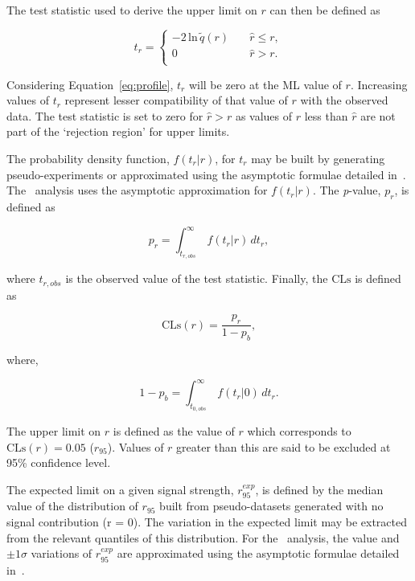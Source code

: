 The test statistic used to derive the upper limit on $r$ can then be defined as

\begin{equation}
t_r = 
\begin{cases}
-2\,\text{ln}\,\tilde{q}(r)\quad &\hat{r} \le r, \\ 
0 \quad &\hat{r} > r. \\ 
\end{cases}
\end{equation}

Considering Equation~\ref{eq:profile}, $t_r$ will be zero at the ML value of $r$.
Increasing values of $t_r$ represent lesser compatibility of that value of $r$ with
the observed data. The test statistic is set to zero for $\hat{r} > r$ as
values of $r$ less than $\hat{r}$ are not part of the `rejection region' for upper limits. 

The probability density function, $f(t_r|r)$, for $t_r$ may be built by 
generating pseudo-experiments or approximated using the asymptotic formulae 
detailed in~\cite{asymp}. The \alphat~analysis uses the asymptotic
approximation for $f(t_r|r)$. The \textit{p}-value, $p_r$, is defined as

\begin{equation}
p_r = \int_{t_{r,obs}}^{\infty}\, f(t_r|r)\, dt_r,
\end{equation}

\noindent where ${t_{r,obs}}$ is the observed value of the test statistic. Finally,
the $\text{CLs}$ is defined as

\begin{equation}
\text{CLs}(r) = \frac{p_r}{1-p_b},
\end{equation}

\noindent where,

\begin{equation}
1-p_b = \int_{t_{0,obs}}^{\infty}\, f(t_r|0)\, dt_r.
\end{equation}

The upper limit on $r$ is defined as the value of $r$ which corresponds to 
$\text{CLs}(r) = 0.05$ ($r_{95}$). Values of $r$ greater than this are said to be excluded at 95\%
confidence level.

The expected limit on a given signal strength, $r_{95}^{exp}$, is defined by the median value of the distribution
of $r_{95}$ built from pseudo-datasets generated with no signal contribution (r = 0). The variation in the 
expected limit may be extracted from the relevant quantiles of this distribution.
For the \alphat~analysis, the value and $\pm 1\sigma$ variations of $r_{95}^{exp}$ are approximated using 
the asymptotic formulae detailed in~\cite{asymp}.

